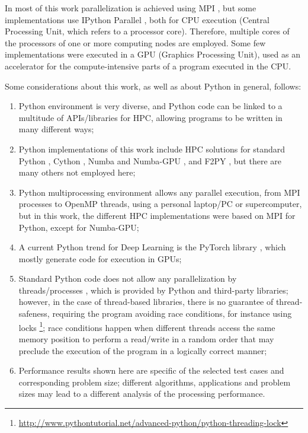 In most of this work parallelization is achieved using MPI \cite {Gropp1996, Barney2021}, but some implementations use IPython Parallel \cite {Limprasert2015}, both for CPU execution (Central Processing Unit, which refers to a processor core). Therefore, multiple cores of the processors of one or more computing nodes are employed. Some few implementations were executed in a GPU (Graphics Processing Unit), used as an accelerator for the compute-intensive parts of a program executed in the CPU.  

Some considerations about this work, as well as about Python in general, follows:

\begin{enumerate}

\item Python environment is very diverse, and Python code can be linked to a multitude of APIs/libraries for HPC, allowing programs to be written in many different ways;

\item Python implementations of this work include HPC solutions for standard Python \cite {Dobesova2011}, Cython \cite {Behnel2010}, Numba and Numba-GPU \cite {Marowka2018}, and F2PY \cite {Peterson2009}, but there are many others not employed here;

\item Python multiprocessing environment allows any parallel execution, from MPI processes to OpenMP \cite {Dagum1998} threads, using a personal laptop/PC or supercomputer, but in this work, the different HPC implementations were based on MPI for Python, except for Numba-GPU; 

\item A current Python trend for Deep Learning is the PyTorch library \cite {Ketkar2021}, which mostly generate code for execution in GPUs; 

\item Standard Python code does not allow any parallelization by threads/processes \cite {Gonzalez2019}, which is provided by Python and third-party libraries; however, in the case of thread-based libraries, there is no guarantee of thread-safeness, requiring the program avoiding race conditions, for instance using locks \footnote {\url{http://www.pythontutorial.net/advanced-python/python-threading-lock}}; race conditions happen when different threads access the same memory position to perform a read/write in a random order that may preclude the execution of the program in a logically correct manner; 

\item Performance results shown here are specific of the selected test cases and corresponding  problem size; different algorithms, applications and problem sizes may lead to a different analysis of the processing performance.

\end{enumerate}


